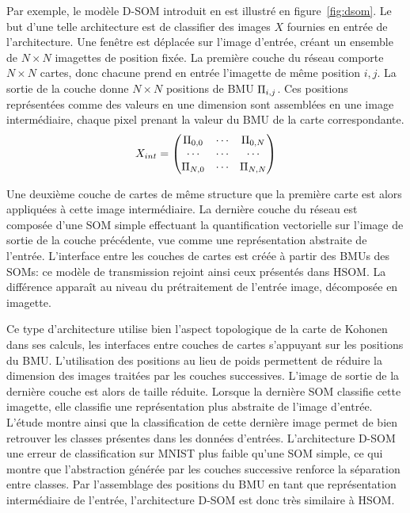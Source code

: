 \documentclass[../main]{subfiles}
\begin{document}
Par exemple, le modèle D-SOM introduit en \cite{Liu2015DeepSM,wickramasinghe_deep_2019} est illustré en figure~\ref{fig:dsom}.
Le but d'une telle architecture est de classifier des images $X$ fournies en entrée de l'architecture.
Une fenêtre est déplacée sur l'image d'entrée, créant un ensemble de $N\times N$ imagettes de position fixée. La première couche du réseau comporte $N \times N$ cartes, donc chacune prend en entrée l'imagette de même position $i,j$.
La sortie de la couche donne $N  \times N$ positions de BMU $\Pi_{i,j}$.
Ces positions représentées comme des valeurs en une dimension sont assemblées en une image intermédiaire, chaque pixel prenant la valeur du BMU de la carte correspondante.
    $$X_{int} = \begin{pmatrix}
    \Pi_{0,0}  &  \cdots & \Pi_{0,N} \\
    \cdots & \cdots & \cdots \\
    \Pi_{N,0} & \cdots & \Pi_{N,N}
    \end{pmatrix} $$

Une deuxième couche de cartes de même structure que la première carte est alors appliquées à cette image intermédiaire. La dernière couche du réseau est composée d'une SOM simple effectuant la quantification vectorielle sur l'image de sortie de la couche précédente, vue comme une représentation abstraite  de l'entrée.
L'interface entre les couches de cartes est créée à partir des BMUs des SOMs: ce modèle de transmission rejoint ainsi ceux présentés dans HSOM. La différence apparaît au niveau du prétraitement de l'entrée image, décomposée en imagette.

Ce type d'architecture utilise bien l'aspect topologique de la carte de Kohonen dans ses calculs, les interfaces entre couches de cartes s'appuyant sur les positions du BMU. L'utilisation des positions au lieu de poids permettent de réduire la dimension des images traitées par les couches successives. L'image de sortie de la dernière couche est alors de taille réduite. Lorsque la dernière SOM classifie cette imagette, elle classifie une représentation plus abstraite de l'image d'entrée. L'étude montre ainsi que la classification de cette dernière image permet de bien retrouver les classes présentes dans les données d'entrées. L'architecture D-SOM une erreur de classification sur MNIST plus faible qu'une SOM simple, ce qui montre que l'abstraction générée par les couches successive renforce la séparation entre classes.
Par l'assemblage des positions du BMU en tant que représentation intermédiaire de l'entrée, l'architecture D-SOM est donc très similaire à HSOM.
\end{document}

